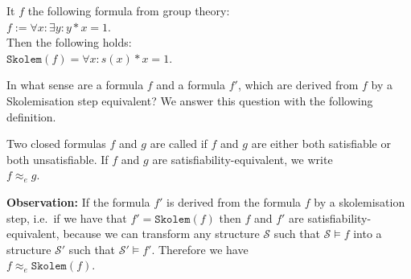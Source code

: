 \example
It $f$ the following formula from group theory:
\\[0.2cm]
\hspace*{1.3cm}
$f := \forall x: \exists y: y * x = 1$. 
\\[0.2cm]
Then the following holds:
\\[0.2cm]
\hspace*{1.3cm}
$\mathtt{Skolem}(f) = \forall x : s(x) * x = 1$.  \eox

\noindent
In what sense are a formula $f$ and a formula $f'$, which are derived from $f$ by a 
Skolem\-isation step equivalent?  We answer this question with the following definition. 

\begin{Definition} \hspace*{\fill} \linebreak
   Two closed formulas $f$ and $g$ are called 
   if $f$ and $g$ are either both satisfiable or both unsatisfiable.
   If $f$ and $g$ are satisfiability-equivalent, we write \\[0.2cm]
   \hspace*{1.3cm} $f \approx_e g$.
\eox
\end{Definition}

\noindent
\textbf{Observation:}
If the formula $f'$ is derived from the formula $f$ by a skolemisation step, i.e.~if we have that $f' = \mathtt{Skolem} (f)$
then $f$ and $f'$ are satisfiability-equivalent, because we can transform any structure
$\mathcal{S}$ such that $\mathcal{S} \models f$ into a structure $\mathcal{S}'$ such that
$\mathcal{S}' \models f'$.  Therefore we have
\\[0.2cm]
\hspace*{1.3cm}
$f \approx_e \mathtt{Skolem}(f)$. \eox


